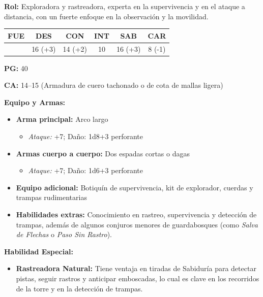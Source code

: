\documentclass[
  twocolumn]{article}
\providecommand{\tightlist}{%
  \setlength{\itemsep}{0pt}\setlength{\parskip}{0pt}}
\begin{document}
\textbf{Rol:} Exploradora y rastreadora, experta en la supervivencia y
en el ataque a distancia, con un fuerte enfoque en la observación y la
movilidad.

\begin{longtable}[]{@{}cccccc@{}}
\toprule\noalign{}
FUE & DES & CON & INT & SAB & CAR \\
\midrule\noalign{}
\endhead
\bottomrule\noalign{}
\endlastfoot
10 & 16 (+3) & 14 (+2) & 10 & 16 (+3) & 8 (-1) \\
\end{longtable}

\textbf{PG:} 40

\textbf{CA:} 14--15 (Armadura de cuero tachonado o de cota de mallas
ligera)

\textbf{Equipo y Armas:}

\begin{itemize}
\tightlist
\item
  \textbf{Arma principal:} Arco largo

  \begin{itemize}
  \tightlist
  \item
    \emph{Ataque:} +7; Daño: 1d8+3 perforante
  \end{itemize}
\item
  \textbf{Armas cuerpo a cuerpo:} Dos espadas cortas o dagas

  \begin{itemize}
  \tightlist
  \item
    \emph{Ataque:} +7; Daño: 1d6+3 perforante
  \end{itemize}
\item
  \textbf{Equipo adicional:} Botiquín de supervivencia, kit de
  explorador, cuerdas y trampas rudimentarias
\item
  \textbf{Habilidades extras:} Conocimiento en rastreo, supervivencia y
  detección de trampas, además de algunos conjuros menores de
  guardabosques (como \emph{Salva de Flechas} o \emph{Paso Sin Rastro}).
\end{itemize}

\textbf{Habilidad Especial:}

\begin{itemize}
\tightlist
\item
  \textbf{Rastreadora Natural:} Tiene ventaja en tiradas de Sabiduría
  para detectar pistas, seguir rastros y anticipar emboscadas, lo cual
  es clave en los recorridos de la torre y en la detección de trampas.
\end{itemize}
\end{document}
